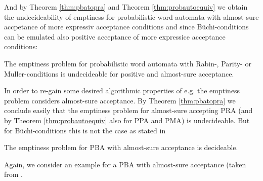 And by Theorem \ref{thm:pbatopra} and Theorem \ref{thm:probautoequiv} we obtain
the undecideability of emptiness for probabilistic word automata with 
almost-sure accpetance of more expressiv acceptance conditions and since 
Büchi-conditions can be emulated also positive acceptance of more expressice
acceptance conditions:
\begin{corollary}
  The emptiness problem for probabilistic word automata with Rabin-, Parity- or
  Muller-conditions is undecideable for positive and almost-sure acceptance.
  \label{cor:emptinessstrongalmostsureprob}
\end{corollary}

In order to re-gain some desired algorithmic properties of e.g. the emptiness
problem \cite{DecProblemsForProbAuto} considers almost-sure acceptance. By
Theorem \ref{thm:pbatopra} we conclude easily that the emptiness problem for
almost-sure accepting \ac{PRA} (and by Theorem \ref{thm:probautoequiv} also for
\ac{PPA} and \ac{PMA}) is undecideable. But for Büchi-conditions this is not
the case as stated in
\begin{theorem}
  \cite[Theorem 6]{DecProblemsForProbAuto}
  The emptiness problem for \ac{PBA} with almost-sure acceptance is decideable.
  \label{thm:emptinessalmostsurepba}
\end{theorem}
Again, we consider an example for a \ac{PBA} with almost-sure acceptance (taken
from \cite{DecProblemsForProbAuto}.
